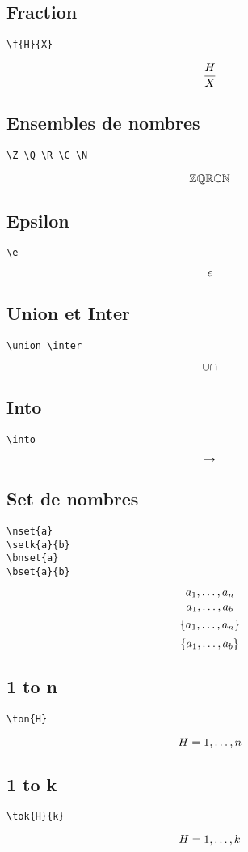 \documentclass[a4paper, 11pt]{article}
\begin{document}
\subsection{Fraction}
\begin{verbatim}
\f{H}{X}
\end{verbatim}
$$\frac{H}{X}$$

\subsection{Ensembles de nombres}
\begin{verbatim}
\Z \Q \R \C \N
\end{verbatim}
$${\mathbb{Z}} {\mathbb{Q}} {\mathbb{R}} {\mathbb{C}} {\mathbb{N}}$$

\subsection{Epsilon}
\begin{verbatim}
\e
\end{verbatim}
$$\epsilon$$

\subsection{Union et Inter}
\begin{verbatim}
\union \inter
\end{verbatim}
$$\cup \cap$$

\subsection{Into}
\begin{verbatim}
\into
\end{verbatim}
$$\rightarrow$$

\subsection{Set de nombres}
\begin{verbatim}
\nset{a}
\setk{a}{b}
\bnset{a}
\bset{a}{b}
\end{verbatim}
$$a_1,\ldots,a_n$$
$$a_1,\ldots,a_b$$
$$\{a_1,\ldots,a_n\}$$
$$\{a_1,\ldots,a_b\}$$

\subsection{1 to n}
\begin{verbatim}
\ton{H}
\end{verbatim}
$$H=1,\ldots,n$$

\subsection{1 to k}
\begin{verbatim}
\tok{H}{k}
\end{verbatim}
$$H=1,\ldots,k$$
\end{document}
